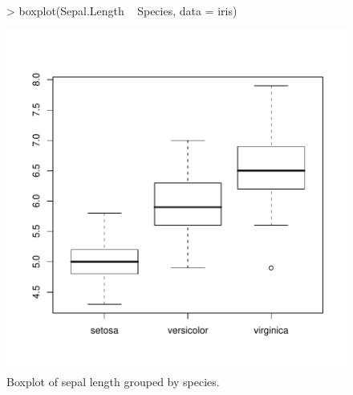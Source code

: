 \documentclass[a4paper]{article}
\begin{document}
\begin{figure}[htbp]
  \begin{center}
\begin{Schunk}
\begin{Sinput}
> boxplot(Sepal.Length ~ Species, data = iris)
\end{Sinput}
\end{Schunk}
\includegraphics{Sweave-test-1-007}
    \caption{Boxplot of sepal length grouped by species.}
  \end{center}
\end{figure}


\end{document}
